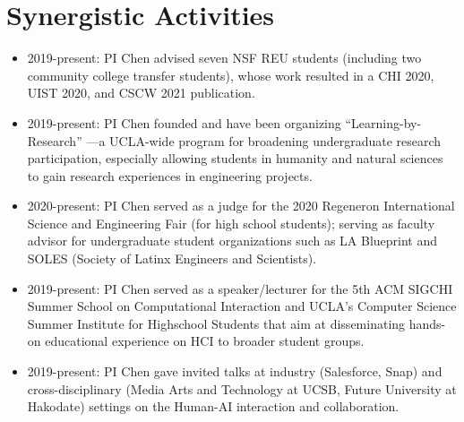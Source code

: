 \section*{Synergistic Activities}

\begin{itemize} [leftmargin=0.25in]
    \item 2019-present: PI Chen advised seven NSF REU students (including two community college transfer students), whose work resulted in a CHI 2020, UIST 2020, and CSCW 2021 publication. 
    
    \item 2019-present: PI Chen founded and have been organizing “Learning-by-Research” —a UCLA-wide program for broadening undergraduate research participation, especially allowing students in humanity and natural sciences to gain research experiences in engineering projects. 

    \item 2020-present: PI Chen served as a judge for the 2020 Regeneron International Science and Engineering Fair (for high school students); serving as faculty advisor for undergraduate student organizations such as LA Blueprint and SOLES (Society of Latinx Engineers and Scientists).

    \item 2019-present: PI Chen served as a speaker/lecturer for the 5th ACM SIGCHI Summer School on Computational Interaction and UCLA's Computer Science Summer Institute for Highschool Students that aim at disseminating hands-on educational experience on HCI to broader student groups. 

    \item 2019-present: PI Chen gave invited talks at industry (Salesforce, Snap) and cross-disciplinary (Media Arts and Technology at UCSB, Future University at Hakodate) settings on the Human-AI interaction and collaboration.

\end{itemize}